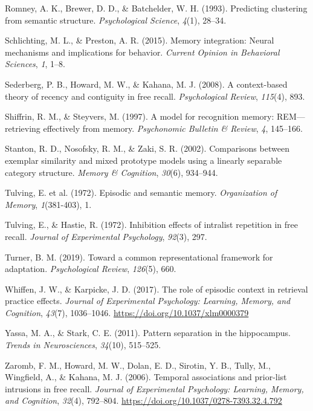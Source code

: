 \documentclass[
  man,
  floatsintext,
  longtable,
  nolmodern,
  notxfonts,
  notimes,
  draftfirst,
  colorlinks=true,linkcolor=blue,citecolor=blue,urlcolor=blue]{apa7}
\newlength{\cslhangindent}
\newenvironment{CSLReferences}[2] %
 {\begin{list}{}{%
  \setlength{\itemindent}{0pt}
  \setlength{\leftmargin}{0pt}
  \setlength{\parsep}{0pt}
  \ifodd #1
   \setlength{\leftmargin}{\cslhangindent}
   \setlength{\itemindent}{-1\cslhangindent}
  \fi
  \setlength{\itemsep}{#2\baselineskip}}}
 {\end{list}}
\begin{document}
\begin{CSLReferences}{1}{0}
Romney, A. K., Brewer, D. D., \& Batchelder, W. H. (1993). Predicting
clustering from semantic structure. \emph{Psychological Science},
\emph{4}(1), 28--34.

Schlichting, M. L., \& Preston, A. R. (2015). Memory integration: Neural
mechanisms and implications for behavior. \emph{Current Opinion in
Behavioral Sciences}, \emph{1}, 1--8.

Sederberg, P. B., Howard, M. W., \& Kahana, M. J. (2008). A
context-based theory of recency and contiguity in free recall.
\emph{Psychological Review}, \emph{115}(4), 893.

Shiffrin, R. M., \& Steyvers, M. (1997). A model for recognition memory:
REM---retrieving effectively from memory. \emph{Psychonomic Bulletin \&
Review}, \emph{4}, 145--166.

Stanton, R. D., Nosofsky, R. M., \& Zaki, S. R. (2002). Comparisons
between exemplar similarity and mixed prototype models using a linearly
separable category structure. \emph{Memory \& Cognition}, \emph{30}(6),
934--944.

Tulving, E. et al. (1972). Episodic and semantic memory.
\emph{Organization of Memory}, \emph{1}(381-403), 1.

Tulving, E., \& Hastie, R. (1972). Inhibition effects of intralist
repetition in free recall. \emph{Journal of Experimental Psychology},
\emph{92}(3), 297.

Turner, B. M. (2019). Toward a common representational framework for
adaptation. \emph{Psychological Review}, \emph{126}(5), 660.

Whiffen, J. W., \& Karpicke, J. D. (2017). The role of episodic context
in retrieval practice effects. \emph{Journal of Experimental Psychology:
Learning, Memory, and Cognition}, \emph{43}(7), 1036--1046.
\url{https://doi.org/10.1037/xlm0000379}

Yassa, M. A., \& Stark, C. E. (2011). Pattern separation in the
hippocampus. \emph{Trends in Neurosciences}, \emph{34}(10), 515--525.

Zaromb, F. M., Howard, M. W., Dolan, E. D., Sirotin, Y. B., Tully, M.,
Wingfield, A., \& Kahana, M. J. (2006). Temporal associations and
prior-list intrusions in free recall. \emph{Journal of Experimental
Psychology: Learning, Memory, and Cognition}, \emph{32}(4), 792--804.
\url{https://doi.org/10.1037/0278-7393.32.4.792}

\end{CSLReferences}
\end{document}
